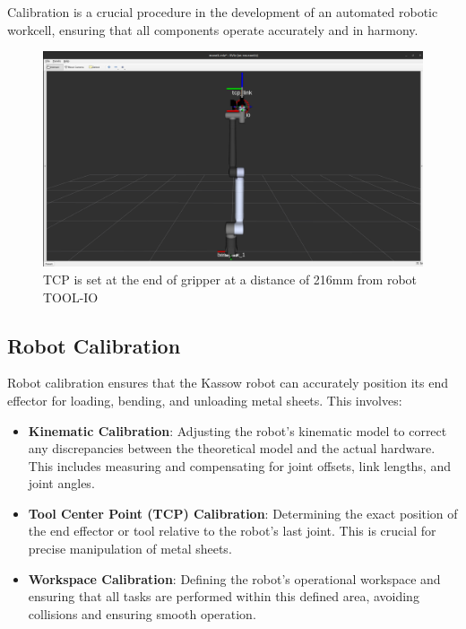 
Calibration is a crucial procedure in the development of 
an automated robotic workcell, ensuring that all components
operate accurately and in harmony.


\begin{figure}[h]
    \centering
    \includegraphics[width=\textwidth]{6. System Integration and Testing/6.2 Calibration Procedures/tcp.PNG}
    \caption{TCP is set at the end of gripper at a distance of 216mm from robot TOOL-IO}
    \label{fig:tcp}
\end{figure}




\subsection{Robot Calibration}
Robot calibration ensures that the Kassow robot can accurately position its end effector for loading, bending, and unloading metal sheets. This involves:

\begin{itemize}
    \item \textbf{Kinematic Calibration}: Adjusting the robot's kinematic model to correct any discrepancies between the theoretical model and the actual hardware. This includes measuring and compensating for joint offsets, link lengths, and joint angles.
    \item \textbf{Tool Center Point (TCP) Calibration}: Determining the exact position of the end effector or tool relative to the robot’s last joint. This is crucial for precise manipulation of metal sheets.
    \item \textbf{Workspace Calibration}: Defining the robot's operational workspace and ensuring that all tasks are performed within this defined area, avoiding collisions and ensuring smooth operation.
\end{itemize}

